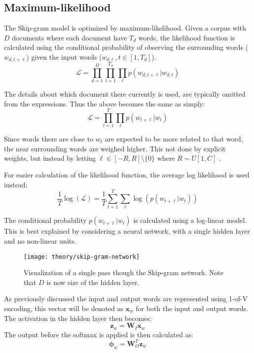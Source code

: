 \newpage
\subsection{Maximum-likelihood}

The Skip-gram model is optimized by maximum-likelihood. Given a corpus with $D$ documents where each document have $T_d$ words, the likelihood function is calculated using the conditional probability of observing the surrounding words ($w_{d, t + \ell}$) given the input words ($w_{d, t}\ , t \in [1, T_d]$).
\begin{equation}
\mathcal{L} = \prod_{d = 1}^D \prod_{t = 1}^{T_d} \prod_{\ell} p(w_{d, t + \ell} | w_{d, t})
\end{equation}

The details about which document there currently is used, are typically omitted from the expressions. Thus the above becomes the same as simply:
\begin{equation}
\mathcal{L} = \prod_{t = 1}^{T} \prod_{\ell} p(w_{t + \ell} | w_{t})
\end{equation}

Since words there are close to $w_t$ are expected to be  more related to that word, the near surrounding words are weighed higher. This not done by explicit weights, but instead by letting $\ell \in [-R, R] \setminus \{ 0 \}$ where $R \sim U[1, C]$ \cite{word2vec-comparing}.

For easier calculation of the likelihood function, the average log likelihood is used instead:
\begin{equation}
\frac{1}{T} \log( \mathcal{L} ) = \frac{1}{T} \sum_{t = 1}^T \sum_{\ell} \log( p(w_{t + \ell} | w_t) )
\end{equation}

The conditional probability $p(w_{t + \ell} | w_t)$ is calculated using a log-linear model. This is best explained by considering a neural network, with a single hidden layer and no non-linear units. 

\begin{figure}[h]
	\centering
	\texttt{[image: theory/skip-gram-network]}
	\caption{Visualization of a single pass though the Skip-gram network. Note that $D$ is now size of the hidden layer.}
\end{figure}

As previously discussed the input and output words are represented using 1-of-V encoding, this vector will be denoted as $\mathbf{x}_w$ for both the input and output words. The activation in the hidden layer then becomes:
\begin{equation}
\mathbf{z}_w = \mathbf{W}_I \mathbf{x}_w
\end{equation}
The output before the softmax is applied is then calculated as:
\begin{equation}
\boldsymbol\phi_w = \mathbf{W}_O^T \mathbf{z}_w
\end{equation}

